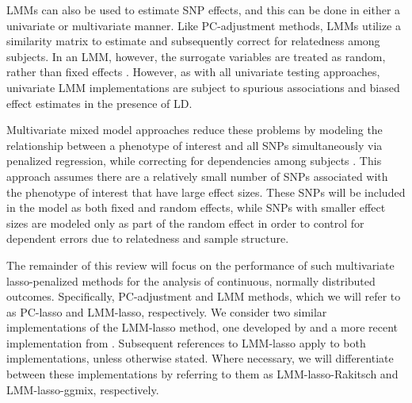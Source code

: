 LMMs can also be used to estimate SNP effects, and this can be done in either a univariate or multivariate manner. Like PC-adjustment methods, LMMs utilize a similarity matrix to estimate and subsequently correct for relatedness among subjects. In an LMM, however, the surrogate variables are treated as random, rather than fixed effects \citep{yu2006unified, kang2010variance, kang2008efficient}. However, as with all univariate testing approaches, univariate LMM implementations are subject to spurious associations and biased effect estimates in the presence of LD. 

Multivariate mixed model approaches reduce these problems by modeling the relationship between a phenotype of interest and all SNPs simultaneously via penalized regression, while correcting for dependencies among subjects \citep{rakitsch2013lasso, bhatnagar2020simultaneous}. This approach assumes there are a relatively small number of SNPs associated with the phenotype of interest that have large effect sizes. These SNPs will be included in the model as both fixed and random effects, while SNPs with smaller effect sizes are modeled only as part of the random effect in order to control for dependent errors due to relatedness and sample structure. 


The remainder of this review will focus on the performance of such multivariate lasso-penalized methods for the analysis of continuous, normally distributed outcomes. Specifically, PC-adjustment and LMM methods, which we will refer to as PC-lasso and LMM-lasso, respectively. We consider two similar implementations of the LMM-lasso method, one developed by \citet{rakitsch2013lasso} and a more recent implementation from \citet{bhatnagar2020simultaneous}. Subsequent references to LMM-lasso apply to both implementations, unless otherwise stated. Where necessary, we will differentiate between these implementations by referring to them as LMM-lasso-Rakitsch and LMM-lasso-ggmix, respectively. 


